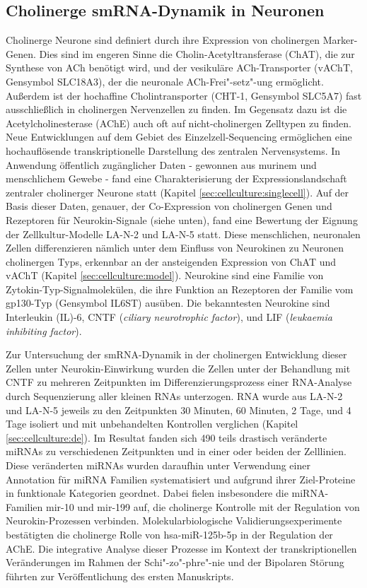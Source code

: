 \subsection{Cholinerge smRNA-Dynamik in Neuronen}
Cholinerge Neurone sind definiert durch ihre Expression von cholinergen Marker-Genen. Dies sind im engeren Sinne die Cholin-Acetyltransferase (ChAT), die zur Synthese von ACh benötigt wird, und der vesikuläre ACh-Transporter (vAChT, Gensymbol SLC18A3), der die neuronale ACh-Frei"-setz"-ung ermöglicht. Außerdem ist der hochaffine Cholintransporter (CHT-1, Gensymbol SLC5A7) fast ausschließlich in cholinergen Nervenzellen zu finden. Im Gegensatz dazu ist die Acetylcholinesterase (AChE) auch oft auf nicht-cholinergen Zelltypen zu finden. Neue Entwicklungen auf dem Gebiet des Einzelzell-Sequencing ermöglichen eine hochauflösende transkriptionelle Darstellung des zentralen Nervensystems. In Anwendung öffentlich zugänglicher Daten - gewonnen aus murinem und menschlichem Gewebe - fand eine Charakterisierung der Expressionslandschaft zentraler cholinerger Neurone statt (Kapitel \ref{sec:cellculture:singlecell}). Auf der Basis dieser Daten, genauer, der Co-Expression von cholinergen Genen und Rezeptoren für Neurokin-Signale (siehe unten), fand eine Bewertung der Eignung der Zellkultur-Modelle LA-N-2 und LA-N-5 statt. Diese menschlichen, neuronalen Zellen differenzieren nämlich unter dem Einfluss von Neurokinen zu Neuronen cholinergen Typs, erkennbar an der ansteigenden Expression von ChAT und vAChT (Kapitel \ref{sec:cellculture:model}). Neurokine sind eine Familie von Zytokin-Typ-Signalmolekülen, die ihre Funktion an Rezeptoren der Familie vom gp130-Typ (Gensymbol IL6ST) ausüben. Die bekanntesten Neurokine sind Interleukin (IL)-6, CNTF (\emph{ciliary neurotrophic factor}), und LIF (\emph{leukaemia inhibiting factor}).

Zur Untersuchung der smRNA-Dynamik in der cholinergen Entwicklung dieser Zellen unter Neurokin-Einwirkung wurden die Zellen unter der Behandlung mit CNTF zu mehreren Zeitpunkten im Differenzierungsprozess einer RNA-Analyse durch Sequenzierung aller kleinen RNAs unterzogen. RNA wurde aus LA-N-2 und LA-N-5 jeweils zu den Zeitpunkten 30 Minuten, 60 Minuten, 2 Tage, und 4 Tage isoliert und mit unbehandelten Kontrollen verglichen (Kapitel \ref{sec:cellculture:de}). Im Resultat fanden sich 490 teils drastisch veränderte miRNAs zu verschiedenen Zeitpunkten und in einer oder beiden der Zelllinien. Diese veränderten miRNAs wurden daraufhin unter Verwendung einer Annotation für miRNA Familien systematisiert und aufgrund ihrer Ziel-Proteine in funktionale Kategorien geordnet. Dabei fielen insbesondere die miRNA-Familien mir-10 und mir-199 auf, die cholinerge Kontrolle mit der Regulation von Neurokin-Prozessen verbinden. Molekularbiologische Validierungsexperimente bestätigten die cholinerge Rolle von hsa-miR-125b-5p in der Regulation der AChE. Die integrative Analyse dieser Prozesse im Kontext der transkriptionellen Veränderungen im Rahmen der Schi"-zo"-phre"-nie und der Bipolaren Störung führten zur Veröffentlichung des ersten Manuskripts.\cite{Lobentanzer2019a}

